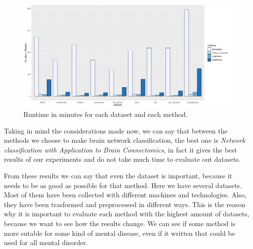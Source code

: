 \begin{figure}[htbp]
	\centering
	\includegraphics[scale=0.3]{Immagini/runtimes_w.png}
	\caption{Runtime in minutes for each dataset and each method.}
	\label{fig:diagram21}
\end{figure}

Taking in mind the considerations made now, we can say that between the methods we choose to make brain network classification, the best one is \textit{Network classification with Application to Brain Connectomics}, in fact it gives the best results of our experiments and do not take much time to evaluate out datasets.

From these results we can say that even the dataset is important, because it needs to be as good as possible for that method. Here we have several datasets. Most of them have been collected with different machines and technologies. Also, they have been trasformed and preprocessed in different ways. This is the reason why it is important to evaluate each method with the highest amount of datasets, because we want to see how the results change. We can see if some method is more sutable for some kind of mental disease, even if it written that could be used for all mental disorder.
